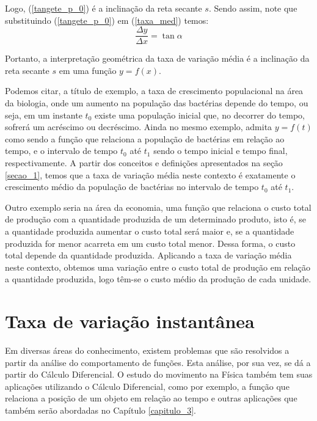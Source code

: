 \documentclass[
	12pt,				%
	openright,			%
    twoside,			%
	a4paper,			%
	chapter=TITLE,		%
	english,			%
	french,				%
	spanish,			%
	brazil				%
	]{abntex2}
\numberwithin{lema}{chapter}
\numberwithin{teorema}{chapter}
\numberwithin{definicao}{chapter}
\numberwithin{exemplo}{chapter}
\numberwithin{figure}{chapter}
\begin{document}
Logo, (\ref{tangete_p_0}) é a inclinação da reta secante $s$. Sendo assim, note que substituindo (\ref{tangete_p_0}) em (\ref{taxa_med}) temos:
\begin{equation}
	\label{taxa_tan}
	\frac{\Delta y}{\Delta x} = \tan \alpha
\end{equation}

Portanto, a interpretação geométrica da taxa de variação média é a inclinação da reta secante $s$ em uma função $y = f(x)$.

Podemos citar, a título de exemplo, a taxa de crescimento populacional na área da biologia, onde um aumento na população das bactérias depende do tempo, ou seja, em um instante $t_0$ existe uma população inicial que, no decorrer do tempo, sofrerá um acréscimo ou decréscimo. Ainda no mesmo exemplo, admita $y=f(t)$ como sendo a função que relaciona a população de bactérias em relação ao tempo, e o intervalo de tempo $t_0$ até $t_1$ sendo o tempo inicial e tempo final, respectivamente. A partir dos conceitos e definições apresentados na seção \ref{secao_1}, temos que a taxa de variação média neste contexto é exatamente o crescimento médio da população de bactérias no intervalo de tempo $t_0$ até $t_1$.

Outro exemplo seria na área da economia, uma função que relaciona o custo total de produção com a quantidade produzida de um determinado produto, isto é, se a quantidade produzida aumentar o custo total será maior e, se a quantidade produzida for menor acarreta em um custo total menor. Dessa forma, o custo total depende da quantidade produzida. Aplicando a taxa de variação média neste contexto, obtemos uma variação entre o custo total de produção em relação a quantidade produzida, logo têm-se o custo médio da produção de cada unidade.

\section{Taxa de variação instantânea}
\label{secao_2}

Em diversas áreas do conhecimento, existem problemas que são resolvidos a partir da análise do comportamento de funções. Esta análise, por sua vez, se dá a partir do Cálculo Diferencial. O estudo do movimento na Física também tem suas aplicações utilizando o Cálculo Diferencial, como por exemplo, a função que relaciona a posição de um objeto em relação ao tempo e outras aplicações que também serão abordadas no Capítulo \ref{capitulo_3}. 
\end{document}
